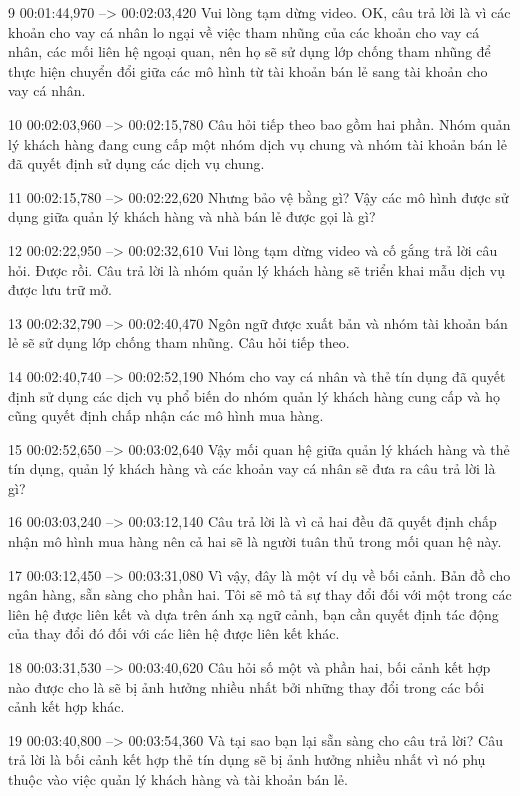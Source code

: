 9
00:01:44,970 --> 00:02:03,420
Vui lòng tạm dừng video.  OK, câu trả lời là vì các khoản cho vay cá nhân lo ngại về việc tham nhũng của các khoản cho vay cá nhân, các mối liên hệ ngoại quan, nên họ sẽ sử dụng lớp chống tham nhũng để thực hiện chuyển đổi giữa các mô hình từ tài khoản bán lẻ sang tài khoản cho vay cá nhân.

10
00:02:03,960 --> 00:02:15,780
Câu hỏi tiếp theo bao gồm hai phần.  Nhóm quản lý khách hàng đang cung cấp một nhóm dịch vụ chung và nhóm tài khoản bán lẻ đã quyết định sử dụng các dịch vụ chung.

11
00:02:15,780 --> 00:02:22,620
Nhưng bảo vệ bằng gì?  Vậy các mô hình được sử dụng giữa quản lý khách hàng và nhà bán lẻ được gọi là gì?

12
00:02:22,950 --> 00:02:32,610
Vui lòng tạm dừng video và cố gắng trả lời câu hỏi.  Được rồi.  Câu trả lời là nhóm quản lý khách hàng sẽ triển khai mẫu dịch vụ được lưu trữ mở.

13
00:02:32,790 --> 00:02:40,470
Ngôn ngữ được xuất bản và nhóm tài khoản bán lẻ sẽ sử dụng lớp chống tham nhũng.  Câu hỏi tiếp theo.

14
00:02:40,740 --> 00:02:52,190
Nhóm cho vay cá nhân và thẻ tín dụng đã quyết định sử dụng các dịch vụ phổ biến do nhóm quản lý khách hàng cung cấp và họ cũng quyết định chấp nhận các mô hình mua hàng.

15
00:02:52,650 --> 00:03:02,640
Vậy mối quan hệ giữa quản lý khách hàng và thẻ tín dụng, quản lý khách hàng và các khoản vay cá nhân sẽ đưa ra câu trả lời là gì?

16
00:03:03,240 --> 00:03:12,140
Câu trả lời là vì cả hai đều đã quyết định chấp nhận mô hình mua hàng nên cả hai sẽ là người tuân thủ trong mối quan hệ này.

17
00:03:12,450 --> 00:03:31,080
Vì vậy, đây là một ví dụ về bối cảnh.  Bản đồ cho ngân hàng, sẵn sàng cho phần hai. Tôi sẽ mô tả sự thay đổi đối với một trong các liên hệ được liên kết và dựa trên ánh xạ ngữ cảnh, bạn cần quyết định tác động của thay đổi đó đối với các liên hệ được liên kết khác.

18
00:03:31,530 --> 00:03:40,620
Câu hỏi số một và phần hai, bối cảnh kết hợp nào được cho là sẽ bị ảnh hưởng nhiều nhất bởi những thay đổi trong các bối cảnh kết hợp khác.

19
00:03:40,800 --> 00:03:54,360
Và tại sao bạn lại sẵn sàng cho câu trả lời?  Câu trả lời là bối cảnh kết hợp thẻ tín dụng sẽ bị ảnh hưởng nhiều nhất vì nó phụ thuộc vào việc quản lý khách hàng và tài khoản bán lẻ.

